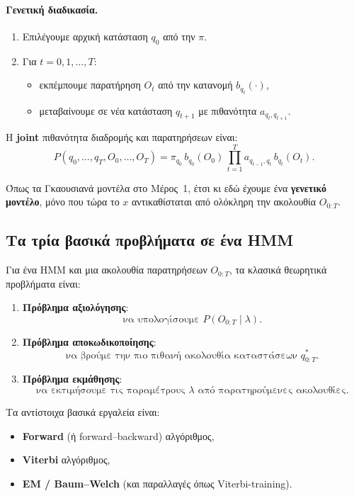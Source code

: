 \documentclass[a4paper,11pt]{article}
\begin{document}
\paragraph{Γενετική διαδικασία.}

\begin{enumerate}
  \item Επιλέγουμε αρχική κατάσταση $q_0$ από την $\pi$.
  \item Για $t=0,1,\dots,T$:
        \begin{itemize}
          \item εκπέμπουμε παρατήρηση $O_t$ από την κατανομή $b_{q_t}(\cdot)$,
          \item μεταβαίνουμε σε νέα κατάσταση $q_{t+1}$ με πιθανότητα $a_{q_t,q_{t+1}}$.
        \end{itemize}
\end{enumerate}

Η \textbf{joint} πιθανότητα διαδρομής και παρατηρήσεων είναι:
\[
P(q_0,\dots,q_T, O_0,\dots,O_T)
= \pi_{q_0}\, b_{q_0}(O_0)\, \prod_{t=1}^T a_{q_{t-1},q_t}\, b_{q_t}(O_t).
\]

Όπως τα Γκαουσιανά μοντέλα στο Μέρος~1, έτσι κι εδώ έχουμε ένα \textbf{γενετικό μοντέλο},
μόνο που τώρα το $x$ αντικαθίσταται από ολόκληρη την ακολουθία $O_{0:T}$.

\subsection{Τα τρία βασικά προβλήματα σε ένα HMM}

Για ένα HMM και μια ακολουθία παρατηρήσεων $O_{0:T}$, τα κλασικά θεωρητικά
προβλήματα είναι:

\begin{enumerate}
  \item \textbf{Πρόβλημα αξιολόγησης}:
        \[
        \text{να υπολογίσουμε } P(O_{0:T} \mid \lambda).
        \]
  \item \textbf{Πρόβλημα αποκωδικοποίησης}:
        \[
        \text{να βρούμε την πιο πιθανή ακολουθία καταστάσεων } q_{0:T}^\ast.
        \]
  \item \textbf{Πρόβλημα εκμάθησης}:
        \[
        \text{να εκτιμήσουμε τις παραμέτρους } \lambda
        \text{ από παρατηρούμενες ακολουθίες}.
        \]
\end{enumerate}

Τα αντίστοιχα βασικά εργαλεία είναι:
\begin{itemize}
  \item \textbf{Forward} (ή forward–backward) αλγόριθμος,
  \item \textbf{Viterbi} αλγόριθμος,
  \item \textbf{EM / Baum–Welch} (και παραλλαγές όπως Viterbi-training).
\end{itemize}
\end{document}
